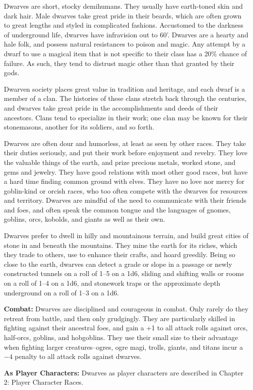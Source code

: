 \begin{multicols}{2}
\begin{minipage}{\columnwidth}
\end{minipage}

Dwarves are short, stocky demihumans. They usually have earth-toned skin and dark hair. Male dwarves take great pride in their beards, which are often grown to great lengths and styled in complicated fashions. Accustomed to the darkness of underground life, dwarves have infravision out to 60'. Dwarves are a hearty and hale folk, and possess natural resistances to poison and magic. Any attempt by a dwarf to use a magical item that is not specific to their class has a 20\% chance of failure. As such, they tend to distrust magic other than that granted by their gods.

Dwarven society places great value in tradition and heritage, and each dwarf is a member of a clan. The histories of these clans stretch back through the centuries, and dwarves take great pride in the accomplishments and deeds of their ancestors. Clans tend to specialize in their work; one clan may be known for their stonemasons, another for its soldiers, and so forth.

Dwarves are often dour and humorless, at least as seen by other races. They take their duties seriously, and put their work before enjoyment and revelry. They love the valuable things of the earth, and prize precious metals, worked stone, and gems and jewelry. They have good relations with most other good races, but have a hard time finding common ground with elves. They have no love nor mercy for goblin-kind or orcish races, who too often compete with the dwarves for resources and territory. Dwarves are mindful of the need to communicate with their friends and foes, and often speak the common tongue and the languages of gnomes, goblins, orcs, kobolds, and giants as well as their own.

Dwarves prefer to dwell in hilly and mountainous terrain, and build great cities of stone in and beneath the mountains. They mine the earth for its riches, which they trade to others, use to enhance their crafts, and hoard greedily. Being so close to the earth, dwarves can detect a grade or slope in a passage or newly constructed tunnels on a roll of 1--5 on a 1d6, sliding and shifting walls or rooms on a roll of 1--4 on a 1d6, and stonework traps or the approximate depth underground on a roll of 1--3 on a 1d6.

\textbf{Combat:} Dwarves are disciplined and courageous in combat. Only rarely do they retreat from battle, and then only grudgingly. They are particularly skilled in fighting against their ancestral foes, and gain a +1 to all attack rolls against orcs, half-orcs, goblins, and hobgoblins. They use their small size to their advantage when fighting larger creatures--ogres, ogre magi, trolls, giants, and titans incur a $-4$ penalty to all attack rolls against dwarves.

\textbf{As Player Characters:} Dwarves as player characters are described in Chapter 2: Player Character Races.

\end{multicols}

